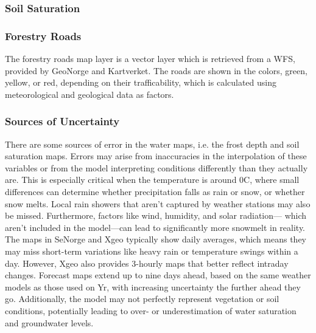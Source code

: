 \subsubsection*{Soil Saturation}

\subsubsection*{Forestry Roads}
The forestry roads map layer is a vector layer which is retrieved from a WFS, provided by GeoNorge and Kartverket. The roads are shown in the colors, green, yellow, or red, depending on their trafficability, which is calculated using meteorological and geological data as factors. 

\subsubsection*{Sources of Uncertainty}
There are some sources of error in the water maps, i.e. the frost depth and soil saturation maps. Errors may arise from inaccuracies in the interpolation of these variables or from the model interpreting conditions differently than they actually are. This is especially critical when the temperature is around 0\textdegree C, where small differences can determine whether precipitation falls as rain or snow, or whether snow melts. Local rain showers that aren't captured by weather stations may also be missed. Furthermore, factors like wind, humidity, and solar radiation— which aren't included in the model—can lead to significantly more snowmelt in reality. The maps in SeNorge and Xgeo typically show daily averages, which means they may miss short-term variations like heavy rain or temperature swings within a day. However, Xgeo also provides 3-hourly maps that better reflect intraday changes. Forecast maps extend up to nine days ahead, based on the same weather models as those used on Yr, with increasing uncertainty the further ahead they go. Additionally, the model may not perfectly represent vegetation or soil conditions, potentially leading to over- or underestimation of water saturation and groundwater levels. \cite{senorge_watermap}

